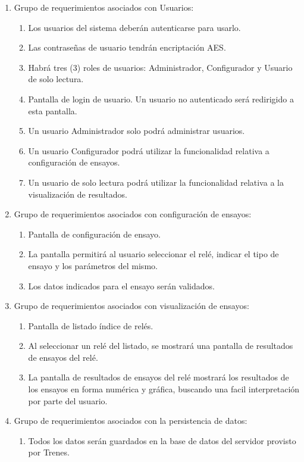 \documentclass[11pt]{charter}
\begin{document}
\begin{enumerate}

\item Grupo de requerimientos asociados con Usuarios:
	\begin{enumerate}
	\item Los usuarios del sistema deberán autenticarse para usarlo.
	\item Las contraseñas de usuario tendrán encriptación AES.
	\item Habrá tres (3) roles de usuarios: Administrador, Configurador y Usuario de solo lectura.
	\item Pantalla de login de usuario. Un usuario no autenticado será redirigido a esta pantalla.
	\item Un usuario Administrador solo podrá administrar usuarios.
	\item Un usuario Configurador podrá utilizar la funcionalidad relativa a configuración de ensayos. 
	\item Un usuario de solo lectura podrá utilizar la funcionalidad relativa a la visualización de resultados.
	\end{enumerate}

\item Grupo de requerimientos asociados con configuración de ensayos:
	\begin{enumerate}
	\item Pantalla de configuración de ensayo.
	\item La pantalla permitirá al usuario seleccionar el relé, indicar el tipo de ensayo y los parámetros del mismo.
	\item Los datos indicados para el ensayo serán validados.
	\end{enumerate}

\item Grupo de requerimientos asociados con visualización de ensayos:
	\begin{enumerate}
	\item Pantalla de listado índice de relés.
	\item Al seleccionar un relé del listado, se mostrará una pantalla de resultados de ensayos del relé.
	\item La pantalla de resultados de ensayos del relé mostrará los resultados de los ensayos en forma numérica y gráfica, buscando una facil interpretación por parte del usuario.
	\end{enumerate}

\item Grupo de requerimientos asociados con la persistencia de datos:
	\begin{enumerate}
	\item Todos los datos serán guardados en la base de datos del servidor provisto por Trenes.
	\end{enumerate}
	
\end{enumerate}
\end{document}
